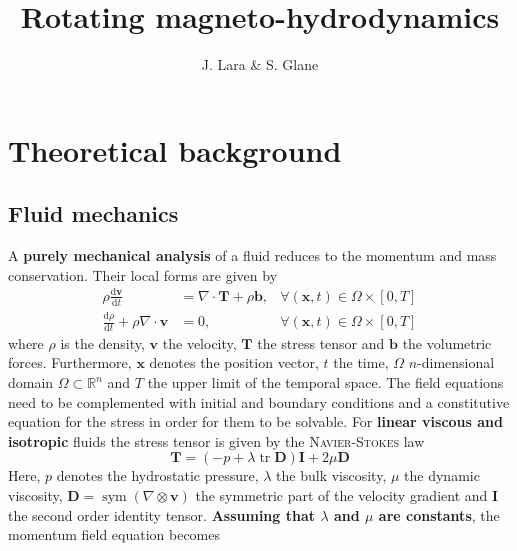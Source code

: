 \documentclass[]{scrartcl}
\title{Rotating magneto-hydrodynamics}
\author{J. Lara \& S. Glane}
\newcommand{\tdfrac}[2]{\frac{\mathrm{d} #1}{\mathrm{d} #2}}
\newcommand{\bs}[1]{\boldsymbol{#1}}
\DeclareMathOperator{\Spur}{tr}
\DeclareMathOperator{\Sym}{sym}
\begin{document}
\maketitle

\begin{abstract}

\end{abstract}

\tableofcontents

\section{Theoretical background}
\subsection{Fluid mechanics}\label{Sec:FluidMechanics}
A \textbf{purely mechanical analysis} of a fluid reduces to the momentum and mass conservation. Their local forms are given by
\begin{subequations}\label{Eqn:FieldEqutaions}
	\begin{align}
		\label{Eqn:LinearMomemntum}
		\rho \tdfrac{\bs{v}}{t} &= \nabla \cdot \bs{T} + \rho \bs{b}, &\forall (\bs{x}, t) \in \Omega \times \left[0, T \right] \\
		\label{Eqn:MassConservation}
		\tdfrac{\rho}{t} + \rho \nabla \cdot \bs{v}&= 0, &\forall (\bs{x}, t) \in \Omega \times  \left[0, T \right]
	\end{align}
\end{subequations} 
where $\rho$ is the density, $\bs{v}$ the velocity, $\bs{T}$ the stress tensor and $\bs{b}$ the volumetric forces. Furthermore, $\bs{x}$ denotes the position vector, $t$ the time, $\Omega$  $n$-dimensional domain $\Omega \subset \mathbb{R}^n$ and $T$ the upper limit of the temporal space. The field equations need to be complemented with initial and boundary conditions and a constitutive equation for the stress in order for them to be solvable. For \textbf{linear viscous and isotropic} fluids the stress tensor is given by the \textsc{Navier-Stokes} law
\begin{equation*}
	\bs{T} = (-p + \lambda \Spur \bs{D}) \bs{I} + 2 \mu \bs{D}
\end{equation*}
Here, $p$ denotes the hydrostatic pressure, $\lambda$ the bulk viscosity, $\mu$ the dynamic viscosity, $\bs{D} = \Sym (\nabla \otimes \bs{v})$ the symmetric part of the velocity gradient and $\bs{I}$ the second order identity tensor. \textbf{Assuming that $\lambda$ and $\mu$ are constants}, the momentum field equation becomes
\end{document}
